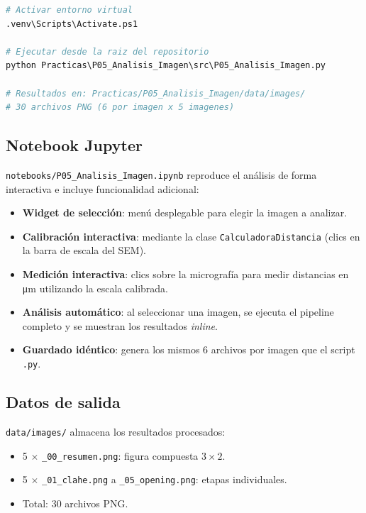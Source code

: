 \documentclass[12pt,a4paper]{article}
\begin{document}
\begin{lstlisting}[language=Python,caption={Uso del script desde la línea de
  comandos.}]
# Activar entorno virtual
.venv\Scripts\Activate.ps1

# Ejecutar desde la raiz del repositorio
python Practicas\P05_Analisis_Imagen\src\P05_Analisis_Imagen.py

# Resultados en: Practicas/P05_Analisis_Imagen/data/images/
# 30 archivos PNG (6 por imagen x 5 imagenes)
\end{lstlisting}

\subsection{Notebook Jupyter}

\texttt{notebooks/P05\_Analisis\_Imagen.ipynb} reproduce el análisis de
forma interactiva e incluye funcionalidad adicional:

\begin{itemize}
	\item \textbf{Widget de selección}: menú desplegable para elegir la
	      imagen a analizar.
	\item \textbf{Calibración interactiva}: mediante la clase
	      \texttt{CalculadoraDistancia} (clics en la barra de escala del SEM).
	\item \textbf{Medición interactiva}: clics sobre la micrografía para
	      medir distancias en \si{\micro\m} utilizando la escala calibrada.
	\item \textbf{Análisis automático}: al seleccionar una imagen, se ejecuta
	      el pipeline completo y se muestran los resultados \emph{inline}.
	\item \textbf{Guardado idéntico}: genera los mismos 6 archivos por imagen
	      que el script \texttt{.py}.
\end{itemize}

\subsection{Datos de salida}

\texttt{data/images/} almacena los resultados procesados:
\begin{itemize}
	\item 5 $\times$ \texttt{\_00\_resumen.png}: figura compuesta
	      $3\times2$.
	\item 5 $\times$ \texttt{\_01\_clahe.png} a
	      \texttt{\_05\_opening.png}: etapas individuales.
	\item Total: 30 archivos PNG.
\end{itemize}
\end{document}
